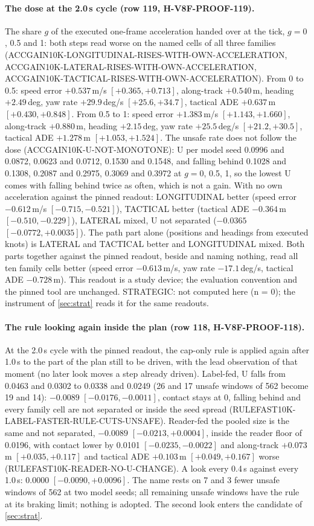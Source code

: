 \paragraph{The dose at the 2.0\,s cycle (row 119, H-V8F-PROOF-119).} The share $g$ of the executed one-frame acceleration handed over at the tick, $g=0$, 0.5 and 1: both steps read worse on the named cells of all three families (ACCGAIN10K-LONGITUDINAL-RISES-WITH-OWN-ACCELERATION, ACCGAIN10K-LATERAL-RISES-WITH-OWN-ACCELERATION, ACCGAIN10K-TACTICAL-RISES-WITH-OWN-ACCELERATION). From 0 to 0.5: speed error $+0.537$\,m/s $[+0.365,+0.713]$, along-track $+0.540$\,m, heading $+2.49$\,deg, yaw rate $+29.9$\,deg/s $[+25.6,+34.7]$, tactical ADE $+0.637$\,m $[+0.430,+0.848]$. From 0.5 to 1: speed error $+1.383$\,m/s $[+1.143,+1.660]$, along-track $+0.880$\,m, heading $+2.15$\,deg, yaw rate $+25.5$\,deg/s $[+21.2,+30.5]$, tactical ADE $+1.278$\,m $[+1.053,+1.524]$. The unsafe rate does not follow the dose (ACCGAIN10K-U-NOT-MONOTONE): U per model seed 0.0996 and 0.0872, 0.0623 and 0.0712, 0.1530 and 0.1548, and falling behind 0.1028 and 0.1308, 0.2087 and 0.2975, 0.3069 and 0.3972 at $g=0$, 0.5, 1, so the lowest U comes with falling behind twice as often, which is not a gain. With no own acceleration against the pinned readout: LONGITUDINAL better (speed error $-0.612$\,m/s $[-0.715,-0.521]$), TACTICAL better (tactical ADE $-0.364$\,m $[-0.510,-0.229]$), LATERAL mixed, U not separated ($-0.0365$ $[-0.0772,+0.0035]$). The path part alone (positions and headings from executed knots) is LATERAL and TACTICAL better and LONGITUDINAL mixed. Both parts together against the pinned readout, beside and naming nothing, read all ten family cells better (speed error $-0.613$\,m/s, yaw rate $-17.1$\,deg/s, tactical ADE $-0.728$\,m). This readout is a study device; the evaluation convention and the pinned tool are unchanged. STRATEGIC: not computed here (n = 0); the instrument of \cref{sec:strat} reads it for the same readouts.

\paragraph{The rule looking again inside the plan (row 118, H-V8F-PROOF-118).} At the 2.0\,s cycle with the pinned readout, the cap-only rule is applied again after 1.0\,s to the part of the plan still to be driven, with the lead observation of that moment (no later look moves a step already driven). Label-fed, U falls from 0.0463 and 0.0302 to 0.0338 and 0.0249 (26 and 17 unsafe windows of 562 become 19 and 14): $-0.0089$ $[-0.0176,-0.0011]$, contact stays at 0, falling behind and every family cell are not separated or inside the seed spread (RULEFAST10K-LABEL-FASTER-RULE-CUTS-UNSAFE). Reader-fed the pooled size is the same and not separated, $-0.0089$ $[-0.0213,+0.0004]$, inside the reader floor of 0.0196, with contact lower by 0.0101 $[-0.0235,-0.0022]$ and along-track $+0.073$\,m $[+0.035,+0.117]$ and tactical ADE $+0.103$\,m $[+0.049,+0.167]$ worse (RULEFAST10K-READER-NO-U-CHANGE). A look every 0.4\,s against every 1.0\,s: $0.0000$ $[-0.0090,+0.0096]$. The name rests on 7 and 3 fewer unsafe windows of 562 at two model seeds; all remaining unsafe windows have the rule at its braking limit; nothing is adopted. The second look enters the candidate of \cref{sec:strat}.

